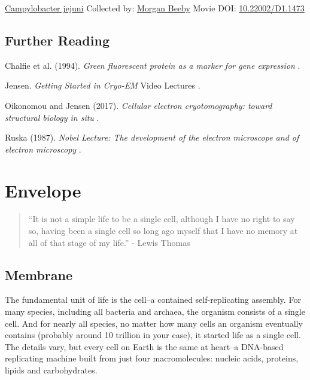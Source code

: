 \documentclass[]{tufte-book}
\begin{document}
\hypertarget{htmlwidget-bede6d336601e799d450}{}

\label{fig:1-10a}\protect\hyperlink{tree}{Campylobacter jejuni} Collected by: \protect\hyperlink{morgan_beeby}{Morgan Beeby} Movie DOI: \href{https://doi.org/10.22002/D1.1473}{10.22002/D1.1473}

\hypertarget{further-reading}{%
\section{Further Reading}\label{further-reading}}

Chalfie et al. (1994). \emph{Green fluorescent protein as a marker for gene expression} \citep{chalfie1994}.

Jensen. \emph{Getting Started in Cryo-EM} Video Lectures \citep{jensenInternet}.

Oikonomou and Jensen (2017). \emph{Cellular electron cryotomography: toward structural biology in situ} \citep{oikonomou2017}.

Ruska (1987). \emph{Nobel Lecture: The development of the electron microscope and of electron microscopy} \citep{ruska1987}.

\hypertarget{envelope}{%
\chapter{Envelope}\label{envelope}}

\begin{quote}
``It is not a simple life to be a single cell, although I have no right to say so, having been a single cell so long ago myself that I have no memory at all of that stage of my life.''
- Lewis Thomas \citep{thomas1990}
\end{quote}

\hypertarget{membrane}{%
\section{Membrane}\label{membrane}}

The fundamental unit of life is the cell--a contained self-replicating assembly. For many species, including all bacteria and archaea, the organism consists of a single cell. And for nearly all species, no matter how many cells an organism eventually contains (probably around 10 trillion in your case), it started life as a single cell. The details vary, but every cell on Earth is the same at heart--a DNA-based replicating machine built from just four macromolecules: nucleic acids, proteins, lipids and carbohydrates.
\end{document}
